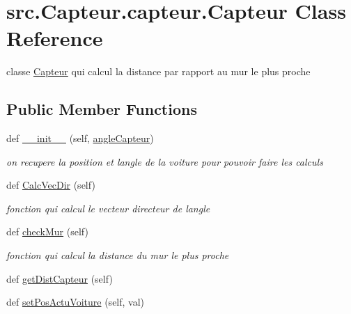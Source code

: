 \hypertarget{classsrc_1_1_capteur_1_1capteur_1_1_capteur}{}\section{src.\+Capteur.\+capteur.\+Capteur Class Reference}
\label{classsrc_1_1_capteur_1_1capteur_1_1_capteur}


classe \hyperlink{classsrc_1_1_capteur_1_1capteur_1_1_capteur}{Capteur} qui calcul la distance par rapport au mur le plus proche  


\subsection*{Public Member Functions}
\begin{DoxyCompactItemize}
\item 
def \hyperlink{classsrc_1_1_capteur_1_1capteur_1_1_capteur_abf779565fbdf63a3e3406165fb2182b2}{\+\_\+\+\_\+init\+\_\+\+\_\+} (self, \hyperlink{classsrc_1_1_capteur_1_1capteur_1_1_capteur_a40d8a8d89f4a45252c79eebf94eb1971}{angle\+Capteur})
\begin{DoxyCompactList}\small\item\em on recupere la position et l\textquotesingle{}angle de la voiture pour pouvoir faire les calculs \end{DoxyCompactList}\item 
def \hyperlink{classsrc_1_1_capteur_1_1capteur_1_1_capteur_a620b8aef4fd51d712725e22cb80c4c15}{Calc\+Vec\+Dir} (self)
\begin{DoxyCompactList}\small\item\em fonction qui calcul le vecteur directeur de l\textquotesingle{}angle \end{DoxyCompactList}\item 
def \hyperlink{classsrc_1_1_capteur_1_1capteur_1_1_capteur_a4a3d1935b2f2f78b1b95b1ea72632d88}{check\+Mur} (self)
\begin{DoxyCompactList}\small\item\em fonction qui calcul la distance du mur le plus proche \end{DoxyCompactList}\item 
def \hyperlink{classsrc_1_1_capteur_1_1capteur_1_1_capteur_a59ee0bd667c48d89c8f3a3566f50c30b}{get\+Dist\+Capteur} (self)
\item 
def \hyperlink{classsrc_1_1_capteur_1_1capteur_1_1_capteur_aed740c4f78618ac121c657cea8adbf7e}{set\+Pos\+Actu\+Voiture} (self, val)
\end{DoxyCompactItemize}
